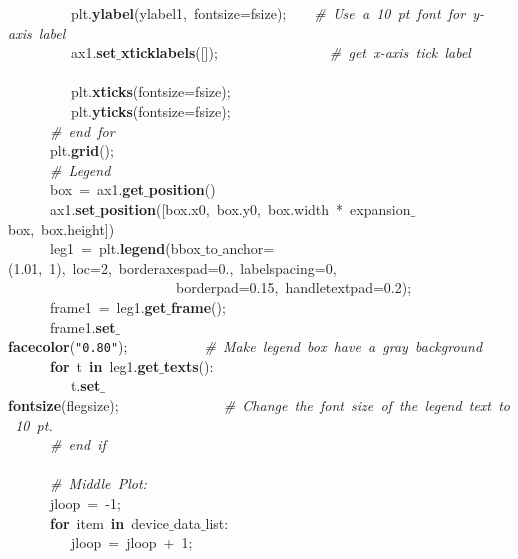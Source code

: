 \mbox{}\ \ \ \ \ \ \ \ \ plt.\textbf{ylabel}(ylabel1,\ fontsize=fsize);\ \ \ \ \textit{\#\ Use\ a\ 10\ pt\ font\ for\ y-axis\ label} \\
\mbox{}\ \ \ \ \ \ \ \ \ ax1.\textbf{set$\_$xticklabels}([]);\ \ \ \ \ \ \ \ \ \ \ \ \ \ \ \ \textit{\#\ get\ x-axis\ tick\ label} \\
\mbox{}\ \ \ \ \ \ \ \ \  \\
\mbox{}\ \ \ \ \ \ \ \ \ plt.\textbf{xticks}(fontsize=fsize); \\
\mbox{}\ \ \ \ \ \ \ \ \ plt.\textbf{yticks}(fontsize=fsize); \\
\mbox{}\ \ \ \ \ \ \textit{\#\ end\ for} \\
\mbox{}\ \ \ \ \ \ plt.\textbf{grid}(); \\
\mbox{}\ \ \ \ \ \ \textit{\#\ Legend} \\
\mbox{}\ \ \ \ \ \ box\ =\ ax1.\textbf{get$\_$position}() \\
\mbox{}\ \ \ \ \ \ ax1.\textbf{set$\_$position}([box.x0,\ box.y0,\ box.width\ *\ expansion$\_$box,\ box.height]) \\
\mbox{}\ \ \ \ \ \ leg1\ =\ plt.\textbf{legend}(bbox$\_$to$\_$anchor=(1.01,\ 1),\ loc=2,\ borderaxespad=0.,\ labelspacing=0,\  \\
\mbox{}\ \ \ \ \ \ \ \ \ \ \ \ \ \ \ \ \ \ \ \ \ \ \ \ borderpad=0.15,\ handletextpad=0.2); \\
\mbox{}\ \ \ \ \ \ frame1\ =\ leg1.\textbf{get$\_$frame}(); \\
\mbox{}\ \ \ \ \ \ frame1.\textbf{set$\_$facecolor}(\texttt{"{}0.80"{}});\ \ \ \ \ \ \ \ \ \ \ \textit{\#\ Make\ legend\ box\ have\ a\ gray\ background} \\
\mbox{}\ \ \ \ \ \ \textbf{for}\ t\ \textbf{in}\ leg1.\textbf{get$\_$texts}(): \\
\mbox{}\ \ \ \ \ \ \ \ \ t.\textbf{set$\_$fontsize}(flegsize);\ \ \ \ \ \ \ \ \ \ \ \ \ \ \ \textit{\#\ Change\ the\ font\ size\ of\ the\ legend\ text\ to\ 10\ pt.} \\
\mbox{}\ \ \ \ \ \ \textit{\#\ end\ if} \\
\mbox{}\ \ \ \ \ \  \\
\mbox{}\ \ \ \ \ \ \textit{\#\ Middle\ Plot:} \\
\mbox{}\ \ \ \ \ \ jloop\ =\ -1; \\
\mbox{}\ \ \ \ \ \ \textbf{for}\ item\ \textbf{in}\ device$\_$data$\_$list: \\
\mbox{}\ \ \ \ \ \ \ \ \ jloop\ =\ jloop\ +\ 1; \\
\mbox{}\ \ \ \ \ \ \ \ \  \\
